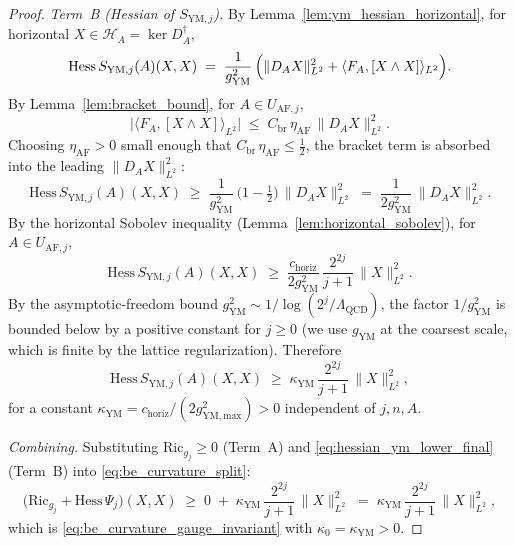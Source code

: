\begin{proof}
\emph{Term~B (Hessian of $S_{\mathrm{YM},j}$).} By
Lemma~\ref{lem:ym_hessian_horizontal}, for horizontal
$X\in\mathcal{H}_{A}=\ker D_{A}^{\dagger}$,
\begin{equation}
\label{eq:hessian_ym_horizontal}
  \mathrm{Hess}\,S_{\mathrm{YM},j}(A)(X,X)
  \;=\;\frac{1}{g_{\mathrm{YM}}^{2}}\,
  \Bigl(\|D_{A}X\|_{L^{2}}^{2}
  +\langle F_{A},[X\wedge X]\rangle_{L^{2}}\Bigr).
\end{equation}
By Lemma~\ref{lem:bracket_bound}, for
$A\in U_{\mathrm{AF},j}$,
\begin{equation}
\label{eq:bracket_bound_applied}
  \bigl|\langle F_{A},[X\wedge X]\rangle_{L^{2}}\bigr|
  \;\le\;C_{\mathrm{br}}\,\eta_{\mathrm{AF}}\,
  \|D_{A}X\|_{L^{2}}^{2}.
\end{equation}
Choosing $\eta_{\mathrm{AF}}>0$ small enough that
$C_{\mathrm{br}}\,\eta_{\mathrm{AF}}\le\tfrac{1}{2}$, the
bracket term is absorbed into the leading
$\|D_{A}X\|_{L^{2}}^{2}$:
\begin{equation}
\label{eq:hessian_ym_lower}
  \mathrm{Hess}\,S_{\mathrm{YM},j}(A)(X,X)
  \;\ge\;\frac{1}{g_{\mathrm{YM}}^{2}}\,
  \bigl(1-\tfrac{1}{2}\bigr)\,\|D_{A}X\|_{L^{2}}^{2}
  \;=\;\frac{1}{2g_{\mathrm{YM}}^{2}}\,
  \|D_{A}X\|_{L^{2}}^{2}.
\end{equation}
By the horizontal Sobolev inequality
(Lemma~\ref{lem:horizontal_sobolev}), for
$A\in U_{\mathrm{AF},j}$,
\begin{equation}
\label{eq:hessian_ym_sobolev}
  \mathrm{Hess}\,S_{\mathrm{YM},j}(A)(X,X)
  \;\ge\;\frac{c_{\mathrm{horiz}}}{2g_{\mathrm{YM}}^{2}}\,
  \frac{2^{2j}}{j+1}\,\|X\|_{L^{2}}^{2}.
\end{equation}
By the asymptotic-freedom bound
$g_{\mathrm{YM}}^{2}\sim 1/\log(2^{j}/\Lambda_{\mathrm{QCD}})$,
the factor $1/g_{\mathrm{YM}}^{2}$ is bounded below by a
positive constant for $j\ge 0$ (we use $g_{\mathrm{YM}}$ at
the coarsest scale, which is finite by the lattice
regularization). Therefore
\begin{equation}
\label{eq:hessian_ym_lower_final}
  \mathrm{Hess}\,S_{\mathrm{YM},j}(A)(X,X)
  \;\ge\;\kappa_{\mathrm{YM}}\,\frac{2^{2j}}{j+1}\,
  \|X\|_{L^{2}}^{2},
\end{equation}
for a constant $\kappa_{\mathrm{YM}}=c_{\mathrm{horiz}}/
(2g_{\mathrm{YM,max}}^{2})>0$ independent of $j,n,A$.

\emph{Combining.} Substituting $\mathrm{Ric}_{g_{j}}\ge 0$
(Term~A) and \eqref{eq:hessian_ym_lower_final} (Term~B) into
\eqref{eq:be_curvature_split}:
\begin{equation}
\label{eq:be_curvature_final}
  \bigl(\mathrm{Ric}_{g_{j}}+\mathrm{Hess}\,\Psi_{j}\bigr)(X,X)
  \;\ge\;0\;+\;\kappa_{\mathrm{YM}}\,
  \frac{2^{2j}}{j+1}\,\|X\|_{L^{2}}^{2}
  \;=\;\kappa_{\mathrm{YM}}\,\frac{2^{2j}}{j+1}\,
  \|X\|_{L^{2}}^{2},
\end{equation}
which is \eqref{eq:be_curvature_gauge_invariant} with
$\kappa_{0}=\kappa_{\mathrm{YM}}>0$.


\end{proof}
